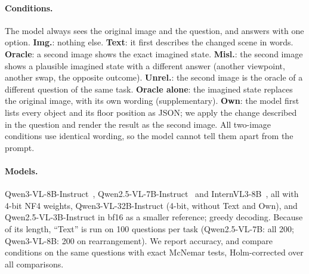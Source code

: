 \paragraph{Conditions.} The model always sees the original image and the question, and answers with one option. \textbf{Img.}: nothing else. \textbf{Text}: it first describes the changed scene in words. \textbf{Oracle}: a second image shows the exact imagined state. \textbf{Misl.}: the second image shows a plausible imagined state with a different answer (another viewpoint, another swap, the opposite outcome). \textbf{Unrel.}: the second image is the oracle of a different question of the same task. \textbf{Oracle alone}: the imagined state replaces the original image, with its own wording (supplementary). \textbf{Own}: the model first lists every object and its floor position as JSON; we apply the change described in the question and render the result as the second image. All two-image conditions use identical wording, so the model cannot tell them apart from the prompt.

\paragraph{Models.} Qwen3-VL-8B-Instruct~\cite{qwen2025qwen3vl}, Qwen2.5-VL-7B-Instruct~\cite{bai2025qwen25vl} and InternVL3-8B~\cite{zhu2025internvl3}, all with 4-bit NF4 weights, Qwen3-VL-32B-Instruct (4-bit, without Text and Own), and Qwen2.5-VL-3B-Instruct in bf16 as a smaller reference; greedy decoding. Because of its length, ``Text'' is run on 100 questions per task (Qwen2.5-VL-7B: all 200; Qwen3-VL-8B: 200 on rearrangement). We report accuracy, and compare conditions on the same questions with exact McNemar tests, Holm-corrected over all comparisons.
